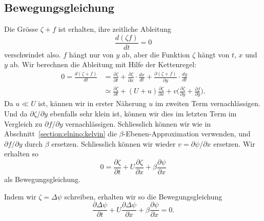 \subsection{Bewegungsgleichung\label{subsection:rossby:bewegungsgleichung}}
Die Grösse $\zeta+f$ ist erhalten, ihre zeitliche Ableitung
\[
\frac{d(\zeta f)}{dt}=0
\]
verschwindet also.
$f$ hängt nur von $y$ ab, aber die Funktion $\zeta$ hängt von $t$,
$x$ und $y$ ab.
Wir berechnen die Ableitung mit Hilfe der Kettenregel:
\begin{align*}
0
=
\frac{d(\zeta+f)}{dt}
&=
\frac{\partial\zeta}{\partial t}
+
\frac{\partial\zeta}{\partial x}\cdot \frac{dx}{dt}
+
\frac{\partial(\zeta+f)}{\partial y}\cdot\frac{dy}{dt}
\\
&\simeq
\frac{\partial\zeta}{\partial t}
+
(U+u)\frac{\partial\zeta}{\partial x}
+
v\biggl(\frac{\partial\zeta}{\partial y} + \frac{\partial f}{\partial y}\biggr).
\end{align*}
Da $u\ll U$ ist, kännen wir in erster Näherung $u$ im zweiten Term 
vernachlässigen.
Und da $\partial\zeta/\partial y$ ebenfalls sehr klein ist, können
wir dies im letzten Term im Vergleich zu $\partial f/\partial y$
vernachlässigen.
Schliesslich können wir wie in Abschnitt~\ref{section:elnino:kelvin}
die $\beta$-Ebenen-Approximation verwenden, und $\partial f/\partial y$
durch $\beta$ ersetzen.
Schliesslich können wir wieder $v=\partial\psi/\partial x$ ersetzen.
Wir erhalten so
\[
0
=
\frac{\partial\zeta}{\partial t}
+
U\frac{\partial\zeta}{\partial x}
+
\beta\frac{\partial\psi}{\partial x}
\]
als Bewegungsgleichung.

Indem wir $\zeta=\Delta \psi$ schreiben, erhalten wir so die 
Bewegungsgleichung
\begin{equation}
\frac{\partial\Delta\psi}{\partial t}
+
U\frac{\partial\Delta\psi}{\partial x}
+
\beta\frac{\partial\psi}{\partial x}
=
0.
\label{rossby:gleichung}
\end{equation}


